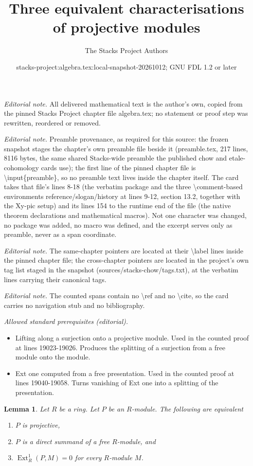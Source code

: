 \documentclass[10pt,a4paper]{amsart}
\title{Three equivalent characterisations of projective modules}
\author{The Stacks Project Authors}
\date{stacks-project:algebra.tex:local-snapshot-20261012; GNU FDL 1.2 or later}
\theoremstyle{plain}
\newtheorem{lemma}[subsection]{Lemma}
\theoremstyle{definition}
\theoremstyle{remark}
\numberwithin{equation}{subsection}
\def\Ext{\mathop{\mathrm{Ext}}\nolimits}
\begin{document}
\maketitle
\noindent\textit{Editorial note.} All delivered mathematical text is the author's own, copied from the pinned Stacks Project chapter file algebra.tex; no statement or proof step was rewritten, reordered or removed.\par\medskip
\noindent\textit{Editorial note.} Preamble provenance, as required for this source: the frozen snapshot stages the chapter's own preamble file beside it (preamble.tex, 217 lines, 8116 bytes, the same shared Stacks-wide preamble the published chow and etale-cohomology cards use); the first line of the pinned chapter file is \textbackslash{}input\{preamble\}, so no preamble text lives inside the chapter itself. The card takes that file's lines 8-18 (the verbatim package and the three \textbackslash{}comment-based environments reference/slogan/history at lines 9-12, section 13.2, together with the Xy-pic setup) and its lines 154 to the runtime end of the file (the native theorem declarations and mathematical macros). Not one character was changed, no package was added, no macro was defined, and the excerpt serves only as preamble, never as a span coordinate.\par\medskip
\noindent\textit{Editorial note.} The same-chapter pointers are located at their \textbackslash{}label lines inside the pinned chapter file; the cross-chapter pointers are located in the project's own tag list staged in the snapshot (sources/stacks-chow/tags.txt), at the verbatim lines carrying their canonical tags.\par\medskip
\noindent\textit{Editorial note.} The counted spans contain no \textbackslash{}ref and no \textbackslash{}cite, so the card carries no navigation stub and no bibliography.\par\medskip
\noindent\textit{Allowed standard prerequisites (editorial).}\begin{itemize}
\item Lifting along a surjection onto a projective module. Used in the counted proof at lines 19023-19026. Produces the splitting of a surjection from a free module onto the module.
\item Ext one computed from a free presentation. Used in the counted proof at lines 19040-19058. Turns vanishing of Ext one into a splitting of the presentation.
\end{itemize}\medskip
\begin{lemma}
\label{lemma-characterize-projective}
Let $R$ be a ring. Let $P$ be an $R$-module.
The following are equivalent
\begin{enumerate}
\item $P$ is projective,
\item $P$ is a direct summand of a free $R$-module, and
\item $\Ext^1_R(P, M) = 0$ for every $R$-module $M$.
\end{enumerate}
\end{lemma}
\end{document}
